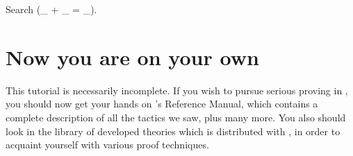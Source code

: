 \documentclass[11pt,a4paper]{book}
\begin{document}
\begin{coq_example}
Search (_ + _ = _).
\end{coq_example}

\section{Now you are on your own}

This tutorial is necessarily incomplete. If you wish to pursue serious
proving in \Coq, you should now get your hands on \Coq's Reference Manual,
which contains a complete description of all the tactics we saw, 
plus many more.
You also should look in the library of developed theories which is distributed
with \Coq, in order to acquaint yourself with various proof techniques.
\end{document}
